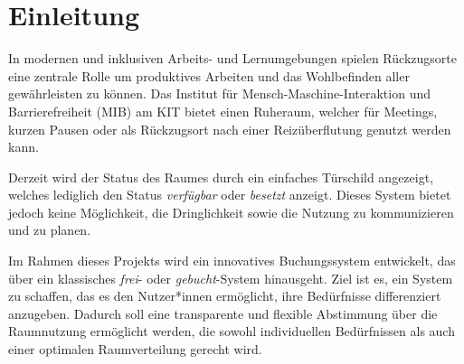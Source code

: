 \chapter{Einleitung}
In modernen und inklusiven Arbeits- und Lernumgebungen spielen Rückzugsorte eine zentrale Rolle um produktives Arbeiten und das Wohlbefinden aller gewährleisten zu können.
Das Institut für Mensch-Maschine-Interaktion und Barrierefreiheit (MIB) am KIT bietet einen Ruheraum, welcher für Meetings, kurzen Pausen oder als Rückzugsort nach einer Reizüberflutung genutzt werden kann.

Derzeit wird der Status des Raumes durch ein einfaches Türschild angezeigt, welches lediglich den Status \textit{verfügbar} oder \textit{besetzt} anzeigt.
Dieses System bietet jedoch keine Möglichkeit, die Dringlichkeit sowie die Nutzung zu kommunizieren und zu planen.

Im Rahmen dieses Projekts wird ein innovatives Buchungssystem entwickelt, das über ein klassisches \textit{frei}- oder \textit{gebucht}-System hinausgeht.
Ziel ist es, ein System zu schaffen, das es den Nutzer*innen ermöglicht, ihre Bedürfnisse differenziert anzugeben.
Dadurch soll eine transparente und flexible Abstimmung über die Raumnutzung ermöglicht werden, die sowohl individuellen Bedürfnissen als auch einer optimalen Raumverteilung gerecht wird.